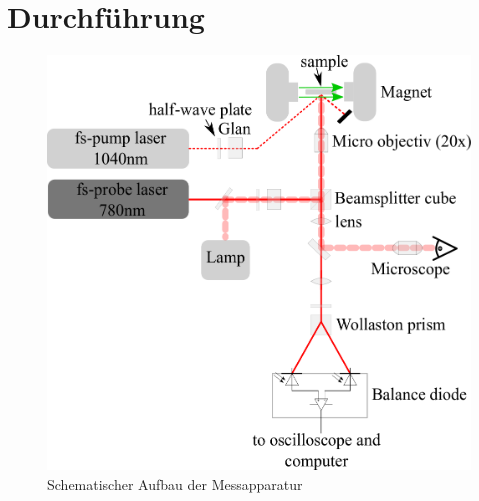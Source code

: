 \section{Durchf\"{u}hrung}


\begin{figure}
  \includegraphics[width=\textwidth]{img/aufbau.png}
  \caption{Schematischer Aufbau der Messapparatur \cite{FP}}
  \label{aufbau}
\end{figure}


\FloatBarrier
